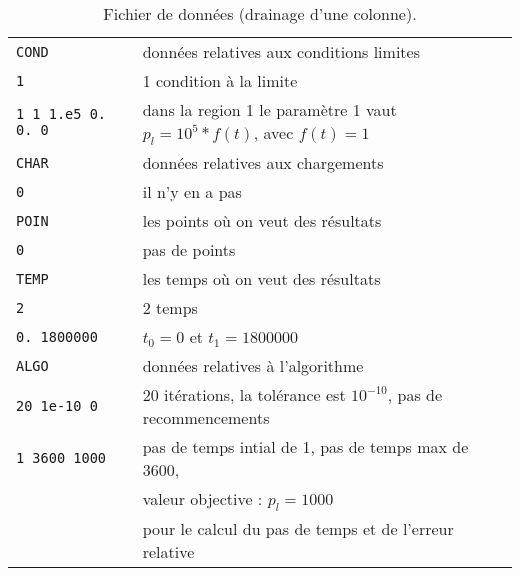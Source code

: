 \documentclass[a4paper,11pt]{article}
\begin{document}
\begin{table}
\begin{center}
\begin{tabular}{>{\tt}ll}
COND & donn\'ees relatives aux conditions limites\\
1 & 1 condition \`a la limite\\
1 1 1.e5 0. 0. 0 & dans la region 1 le param\`etre 1 vaut $p_l=10^5*f(t)$, avec $f(t)=1$\\
CHAR & donn\'ees relatives aux chargements\\
0 & il n'y en a pas\\
POIN & les points o\`u on veut des r\'esultats\\
0 & pas de points\\
TEMP & les temps o\`u on veut des r\'esultats\\
2 & 2 temps\\
0. 1800000 & $t_0=0$ et $t_1=1800000$\\
ALGO & donn\'ees relatives \`a l'algorithme\\
20 1e-10 0 & 20 it\'erations, la tol\'erance est $10^{-10}$, pas de recommencements\\
1 3600 1000 & pas de temps intial de 1, pas de temps max de 3600,\\
& valeur objective : $p_l=1000$\\
&  pour le calcul du pas de temps et de l'erreur relative\\ \hline
\end{tabular}
\end{center}
\caption{Fichier de donn\'ees (drainage d'une colonne).}
\label{tab:t4}
\end{table}
\end{document}
